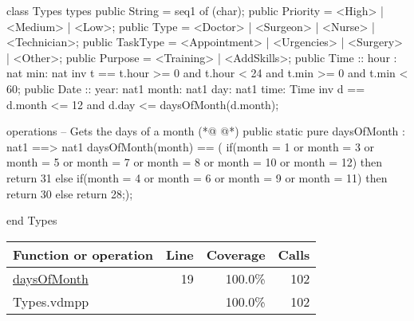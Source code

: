 \begin{vdmpp}[breaklines=true]
class Types
types
 public String = seq1 of (char);
 public Priority = <High> | <Medium> | <Low>;
 public Type = <Doctor> | <Surgeon> | <Nurse> | <Technician>;
 public TaskType = <Appointment> | <Urgencies> | <Surgery> | <Other>;
 public Purpose = <Training> | <AddSkills>;
 public Time :: hour : nat
         min: nat
 inv t == t.hour >= 0 and t.hour < 24 and t.min >= 0 and t.min < 60;
 public Date ::  year: nat1
         month: nat1
         day: nat1
         time: Time
 inv d == d.month <= 12 and d.day <= daysOfMonth(d.month);
 
operations
 -- Gets the days of a month
(*@
\label{daysOfMonth:19}
@*)
 public static pure daysOfMonth : nat1 ==> nat1
  daysOfMonth(month) == (
              if(month = 1 or month = 3 or month = 5 or month = 7 or month = 8 or month = 10 or month = 12)
               then return 31
              else if(month = 4 or month = 6 or month = 9 or month = 11)
               then return 30
              else
               return 28;);
                
end Types
\end{vdmpp}
\bigskip
\begin{longtable}{|l|r|r|r|}
\hline
Function or operation & Line & Coverage & Calls \\
\hline
\hline
\hyperref[daysOfMonth:19]{daysOfMonth} & 19&100.0\% & 102 \\
\hline
\hline
Types.vdmpp & & 100.0\% & 102 \\
\hline
\end{longtable}

